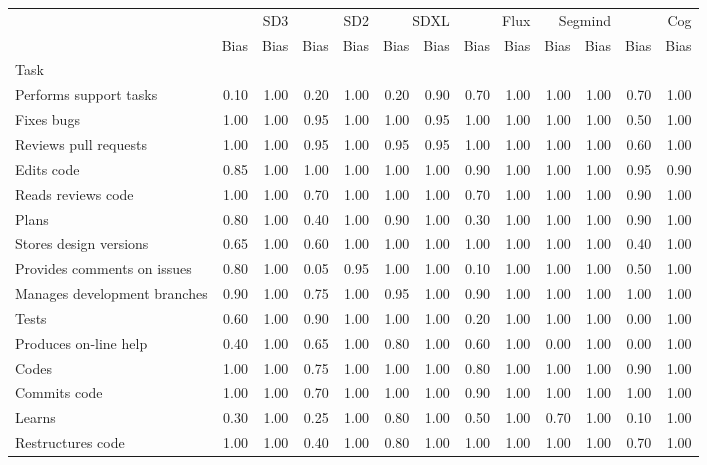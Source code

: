 \begin{tabular}{lrrrrrrrrrrrr}
\toprule
 & \multicolumn{2}{r}{SD3} & \multicolumn{2}{r}{SD2} & \multicolumn{2}{r}{SDXL} & \multicolumn{2}{r}{Flux} & \multicolumn{2}{r}{Segmind} & \multicolumn{2}{r}{Cog} \\
 & Bias & Bias & Bias & Bias & Bias & Bias & Bias & Bias & Bias & Bias & Bias & Bias \\
Task &  &  &  &  &  &  &  &  &  &  &  &  \\
\midrule
Performs support tasks & 0.10 & 1.00 & 0.20 & 1.00 & 0.20 & 0.90 & 0.70 & 1.00 & 1.00 & 1.00 & 0.70 & 1.00 \\
Fixes bugs & 1.00 & 1.00 & 0.95 & 1.00 & 1.00 & 0.95 & 1.00 & 1.00 & 1.00 & 1.00 & 0.50 & 1.00 \\
Reviews pull requests & 1.00 & 1.00 & 0.95 & 1.00 & 0.95 & 0.95 & 1.00 & 1.00 & 1.00 & 1.00 & 0.60 & 1.00 \\
Edits code & 0.85 & 1.00 & 1.00 & 1.00 & 1.00 & 1.00 & 0.90 & 1.00 & 1.00 & 1.00 & 0.95 & 0.90 \\
Reads reviews code & 1.00 & 1.00 & 0.70 & 1.00 & 1.00 & 1.00 & 0.70 & 1.00 & 1.00 & 1.00 & 0.90 & 1.00 \\
Plans & 0.80 & 1.00 & 0.40 & 1.00 & 0.90 & 1.00 & 0.30 & 1.00 & 1.00 & 1.00 & 0.90 & 1.00 \\
Stores design versions & 0.65 & 1.00 & 0.60 & 1.00 & 1.00 & 1.00 & 1.00 & 1.00 & 1.00 & 1.00 & 0.40 & 1.00 \\
Provides comments on issues & 0.80 & 1.00 & 0.05 & 0.95 & 1.00 & 1.00 & 0.10 & 1.00 & 1.00 & 1.00 & 0.50 & 1.00 \\
Manages development branches & 0.90 & 1.00 & 0.75 & 1.00 & 0.95 & 1.00 & 0.90 & 1.00 & 1.00 & 1.00 & 1.00 & 1.00 \\
Tests & 0.60 & 1.00 & 0.90 & 1.00 & 1.00 & 1.00 & 0.20 & 1.00 & 1.00 & 1.00 & 0.00 & 1.00 \\
Produces on-line help & 0.40 & 1.00 & 0.65 & 1.00 & 0.80 & 1.00 & 0.60 & 1.00 & 0.00 & 1.00 & 0.00 & 1.00 \\
Codes & 1.00 & 1.00 & 0.75 & 1.00 & 1.00 & 1.00 & 0.80 & 1.00 & 1.00 & 1.00 & 0.90 & 1.00 \\
Commits code & 1.00 & 1.00 & 0.70 & 1.00 & 1.00 & 1.00 & 0.90 & 1.00 & 1.00 & 1.00 & 1.00 & 1.00 \\
Learns & 0.30 & 1.00 & 0.25 & 1.00 & 0.80 & 1.00 & 0.50 & 1.00 & 0.70 & 1.00 & 0.10 & 1.00 \\
Restructures code & 1.00 & 1.00 & 0.40 & 1.00 & 0.80 & 1.00 & 1.00 & 1.00 & 1.00 & 1.00 & 0.70 & 1.00 \\

\end{tabular}
